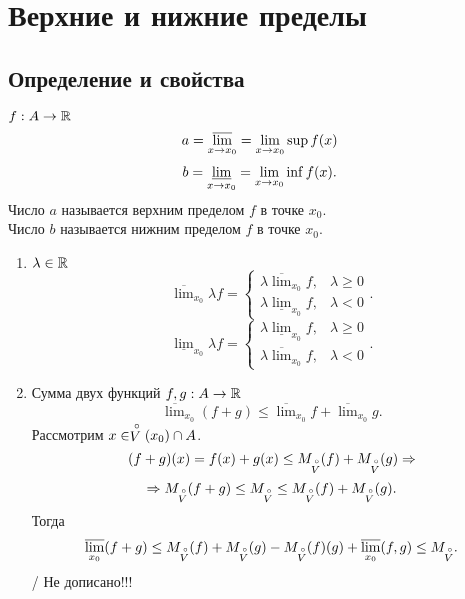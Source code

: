 \documentclass[12pt]{report}
\begin{document}
\section{Верхние и нижние пределы}
\subsection{Определение и свойства}\label{ques_30}
\begin{defn}
    $f: A \to \mathbb{R}$\\
    \[
	a = \varlimsup_{x \to x_0}=\lim\limits_{x \to x_0} \sup f(x)
    \]\[
    b = \varliminf_{x \to x_0}=\lim\limits_{x \to x_0} \inf f(x)
    .\] 
    Число $a$ называется верхним пределом $f$ в точке $x_0$. \\
Число $b$ называется нижним пределом $f$ в точке $x_0$.
\end{defn}
\begin{prop}
    \begin{enumerate}
        \item $\lambda \in \mathbb{R}$ 
	    \[
		\overline \lim_{x_0} \lambda f = \left \{
		    \begin{array}{ll}
			\lambda \overline \lim_{x_0} f, & \lambda \ge 0\\
			\lambda \underline \lim_{x_0} f, & \lambda <0
		    \end{array}
		    \right .
	    .\] 
	    \[
		\underline \lim_{x_0} \lambda f = \left \{
		    \begin{array}{ll}
			\lambda \underline \lim_{x_0} f, & \lambda \ge 0\\
			\lambda \overline \lim_{x_0} f, & \lambda <0
		    \end{array}
		    \right .
	    .\] 
	\item Сумма двух функций $f, g : A \to \mathbb{R}$\\
	    \[
		\overline {\lim}_{x_0} (f+g) \le \overline\lim_{x_0} f + \overline \lim_{x_0} g
	    .\] 
	    Рассмотрим $x \in \stackrel \circ V(x_0)\cap A$.
	    \[
		(f+g)(x) = f(x) + g(x) \le M_{\stackrel \circ V} (f) + M_{\stackrel \circ V} (g) \Rightarrow 
	    \] 
	    \[
		\Rightarrow M_{\stackrel \circ V}  (f + g) \le M_{\stackrel \circ V} \le  M_{\stackrel \circ V} (f) + M_{\stackrel \circ V} (g) 
	    .\] 
	    Тогда 
	    \[
		\varlimsup _{x_0} (f+g) \le M_{\stackrel \circ V} (f) + M_{\stackrel \circ V}(g) - M_{\stackrel \circ V}(f)(g) + \varlimsup_{x_0}(f, g) \le M_{\stackrel \circ V} 
	    .\] 
	    / Не дописано!!!
    \end{enumerate}
\end{prop}
\end{document}
